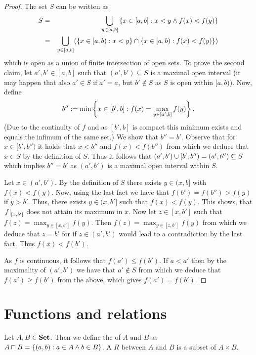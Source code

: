 \documentclass[8pt,a4paper]{article}
\begin{document}
\begin{proof}
The set $S$ can be written as
\begin{eqnarray*}
    S
    &=& \Setjoin_{y\in[a,b]}\set{x\in[a,b]:x<y \lgand f(x)<f(y)}\\
    &=& \Setjoin_{y\in[a,b]}(\set{x\in[a,b):x<y\}\setmeet\{x\in[a,b):f(x)<f(y)})
\end{eqnarray*}
which is open as a union of finite intersection of open sets.
To prove the second claim, let $a',b'\in [a,b]$ such that
$(a',b')\subseteq S$ is a maximal open interval (it may happen that also
$a'\in S$ if $a'=a$, but $b'\not\in S$ as $S$ is open within $[a,b)$). Now, define
\begin{equation}
b'':=\min\set{x\in[b',b]:f(x)=\max_{y\in[a',b]}{f(y)}}\textrm{.}
\end{equation}
(Due to the continuity of $f$ and as $[b',b]$ is compact this minimum exists and equals the
infimum of the same set.) We show that $b''=b'$. Observe that for
$x\in[b',b'')$ it holds that $x<b''$ and $f(x)<f(b'')$ from which we
deduce that $x\in S$ by the definition of $S$.
Thus it follows that $(a',b')\cup[b',b'')=(a',b'')\subseteq S$
which implies $b''=b'$ as $(a',b')$ is a maximal open interval within
$S$.

Let $x\in(a',b')$. By the definition of $S$ there exists $y\in(x,b]$
with $f(x)<f(y)$. Now, using the last fact we have that
$f(b')=f(b'')>f(y)$ if $y>b'$. Thus, there exists $y\in(x,b']$ such
that $f(x)<f(y)$. This shows, that $\left. f\right\vert_{[x,b']}$ does not attain its
maximum in $x$. Now let $z\in[x,b']$ such that
$f(z)=\max_{y\in[x,b']}{f(y)}$. Then $f(z)=\max_{y\in[z,b']}{f(y)}$
from which we deduce that $z=b'$ for if $z\in(a',b')$ would lead to a
contradiction by the last fact. Thus $f(x)<f(b')$.

As $f$ is continuous, it follows that $f(a')\leq f(b')$. If $a<a'$
then by the maximality of $(a',b')$ we have that $a'\notin S$ from
which we deduce that $f(a')\geq f(b')$ from the above, which gives $f(a')=f(b')$. 
\end{proof}

\section{Functions and relations}

\begin{definition}
Let $A, B\in\mathbf{Set}$. Then we define the  of $A$
and $B$ as $A\mathbin{\sqcap} B = \{(a,b):a\in A\wedge b\in B\}$.
A  $R$ between $A$ and $B$ is a subset of $A\times B$.
\end{definition}
\end{document}
